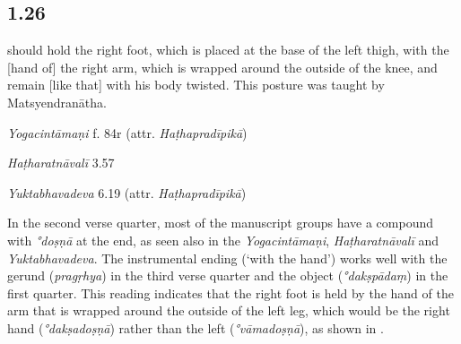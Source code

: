 \begin{ekdosis}
\subsection*{1.26}
\begin{translation} should hold the right foot, which is placed at the base of the left thigh, with the [hand of] the right arm, which is wrapped around the outside of the knee, and remain [like that] with his body twisted. This posture was taught by Matsyendranātha.
\end{translation}

\begin{testimonia}[hp01_026]
\emph{Yogacintāmaṇi} f. 84r (attr. \emph{Haṭhapradīpikā})

\begin{versinnote}
\end{versinnote}

\emph{Haṭharatnāvalī} 3.57

\begin{versinnote}
\tl{\var{°dakṣapādo ] °dakṣapādaṃ P, °dakṣapādau t1}\\!}
\end{versinnote}

\emph{Yuktabhavadeva} 6.19 (attr. \emph{Haṭhapradīpikā})

\begin{versinnote}
\end{versinnote}

\end{testimonia}

\begin{philcomm}[hp01_026]
In the second verse quarter, most of the manuscript groups have a compound with \emph{°doṣṇā} at the end, as seen also in the \emph{Yogacintāmaṇi}, \emph{Haṭharatnāvalī} and \emph{Yuktabhavadeva}. The instrumental ending (`with the hand') works well with the gerund (\emph{pragṛhya}) in the third verse quarter and the object (\emph{°dakṣpādaṃ}) in the first quarter. This reading indicates that the right foot is held by the hand of the arm that is wrapped around the outside of the left leg, which would be the right hand (\emph{°dakṣadoṣṇā}) rather than the left (\emph{°vāmadoṣṇā}), as shown in .


\end{philcomm}
\end{ekdosis}
